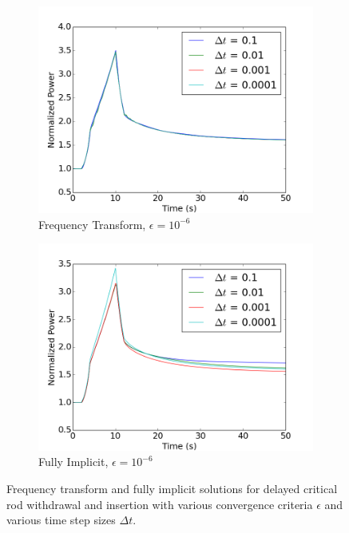 \documentclass[12pt]{report}
\begin{document}
\begin{figure}[ht]
			\begin{subfigure}{.5\textwidth}
				\centering
				\includegraphics[width=.95\linewidth]{figs/power_case1_conv2.png}
				\caption{Frequency Transform, $\epsilon = 10^{-6}$}
				\label{fig::power_1_3_ft}
			\end{subfigure}%
			\begin{subfigure}{.5\textwidth}
				\centering
				\includegraphics[width=.95\linewidth]{figs/power_case1_conv2_omega0.png}
				\caption{Fully Implicit, $\epsilon = 10^{-6}$}
				\label{fig::power_1_3_fi}
			\end{subfigure}
			\caption{Frequency transform and fully implicit solutions for delayed critical rod withdrawal and insertion with various convergence criteria $\epsilon$ and various time step sizes $\Delta t$.}
			\label{fig::power_1}
		\end{figure}
\end{document}
